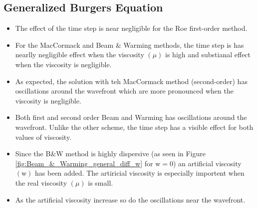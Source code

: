 \documentclass[11pt, a4paper]{article}
\begin{document}
\subsection{Generalized Burgers Equation}
\begin{itemize}
    \item The effect of the time step is near negligible for the Roe first-order method.
    \item For the MacCormack and Beam $\&$ Warming methods, the time step is has nearlly negligible effect when the viscosity $\left(\mu\right)$ is high and substianal effect when the viscosity is negligible.
    \item As expected, the solution with teh MacCormack method (second-order) has oscillations around the wavefront which are more pronounced when the viscosity is negligible.
    \item Both first and second order Beam and Warming has oscillations around the wavefront. Unlike the other scheme, the time step has a visible effect for both values of viscosity.
    \item Since the B$\&$W method is highly dispersive (as seen in Figure \ref{fig:Beam_&_Warming_general_diff_w} for $\mathrm{w}=0$) an artificial viscosity $\left(\mathrm{w}\right)$ has been added. The artiricial viscosity is especially importent when the real viscosity $\left(\mu\right)$ is small. 
    \item As the artificial viscosity increase so do the oscillations near the wavefront.
\end{itemize}
\end{document}
